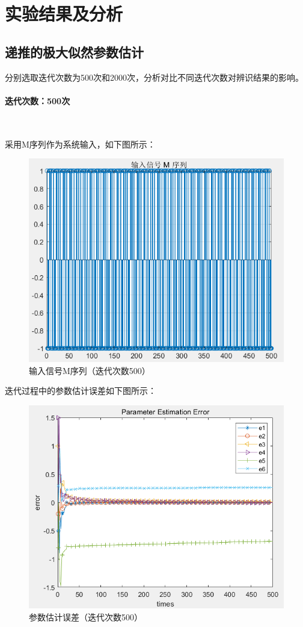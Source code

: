 \documentclass[UTF8]{article}
\begin{document}
%
\section{实验结果及分析}
\subsection{递推的极大似然参数估计}
分别选取迭代次数为500次和2000次，分析对比不同迭代次数对辨识结果的影响。

\paragraph{迭代次数：500次}~{}

采用M序列作为系统输入，如下图所示：
\begin{figure}[H]
    \centering %
    \includegraphics[width=.8\textwidth]{figure/输入信号M序列（迭代次数500）.png} 
    \caption{输入信号M序列（迭代次数500）} %
\end{figure}

迭代过程中的参数估计误差如下图所示：
\begin{figure}[H]
    \centering %
    \includegraphics[width=.8\textwidth]{figure/递推极大似然-参数估计误差.png} 
    \caption{参数估计误差（迭代次数500）} %
\end{figure}
\end{document}
